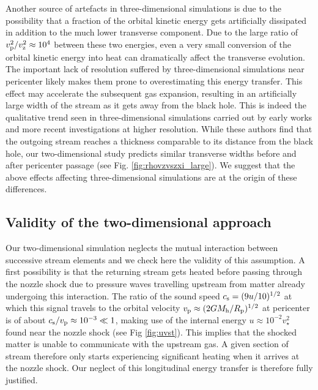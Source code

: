 \documentclass[a4paper,fleqn,usenatbib]{mnras}
\newcommand{\rp}{R_{\rm p}}
\newcommand{\mh}{M_{\rm h}}
\begin{document}
Another source of artefacts in three-dimensional simulations is due to the possibility that a fraction of the orbital kinetic energy gets artificially dissipated in addition to the much lower transverse component. Due to the large ratio of $v^2_{\rm p}/v^2_{\rm z} \approx 10^4$ between these two energies, even a very small conversion of the orbital kinetic energy into heat can dramatically affect the transverse evolution. The important lack of resolution suffered by three-dimensional simulations near pericenter likely makes them prone to overestimating this energy transfer. This effect may accelerate the subsequent gas expansion, resulting in an artificially large width of the stream as it gets away from the black hole.  This is indeed the qualitative trend seen in three-dimensional simulations carried out by early works \citep{lee1996_tvd,ayal2000} and more recent investigations at higher resolution. While these authors find that the outgoing stream reaches a thickness comparable to its distance from the black hole, our two-dimensional study predicts similar transverse widths before and after pericenter passage (see Fig. \ref{fig:rhovzvszxi_large}). We suggest that the above effects affecting three-dimensional simulations are at the origin of these differences.





\subsection{Validity of the two-dimensional approach}
\label{sec:validity}

Our two-dimensional simulation neglects the mutual interaction between successive stream elements and we check here the validity of this assumption. A first possibility is that the returning stream gets heated before passing through the nozzle shock due to pressure waves travelling upstream from matter already undergoing this interaction. The ratio of the sound speed $c_{\rm s} = (9 u /10)^{1/2}$ at which this signal travels to the orbital velocity  $v_{\rm p} \approx (2 G  \mh /\rp)^{1/2}$ at pericenter is of about $c_{\rm s}/v_{\rm p} \approx 10^{-3} \ll 1$, making use of the internal energy $u \approx 10^{-2} v^2_{\star}$ found near the nozzle shock (see Fig \ref{fig:uvst}). This implies that the shocked matter is unable to communicate with the upstream gas. A given section of stream therefore only starts experiencing significant heating when it arrives at the nozzle shock. Our neglect of this longitudinal energy transfer is therefore fully justified.
\end{document}
